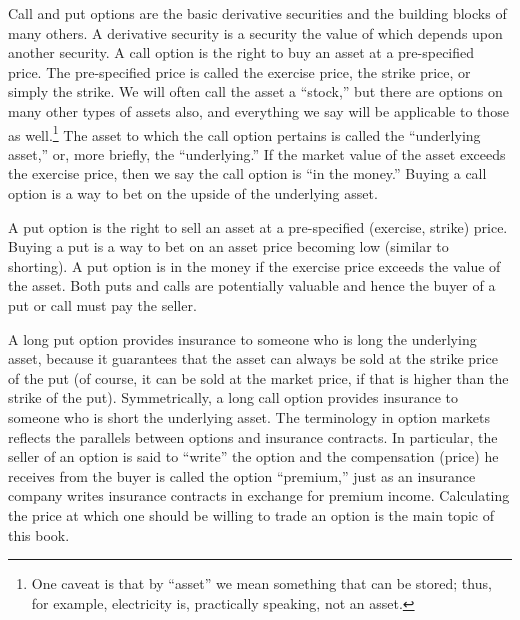 Call and put options are the basic derivative securities and the building blocks of many others.  A derivative security is a security the value of which depends upon another security. 
A call option  is the right to buy an asset at a pre-specified price.  The pre-specified price is called the exercise price, the strike price, or simply the strike.    We will often call the asset a ``stock,'' but there are options on many other types of assets also, and everything we say will be applicable to those as well.\footnote{One caveat is that by ``asset'' we mean something that can be stored; thus, for example, electricity is, practically speaking, not an asset.}  The asset to which the call option pertains is called the ``underlying asset,''  or, more briefly, the ``underlying.''  If the market value of the asset exceeds the exercise price, then we say the call option is ``in the money.''  Buying a call option is a way to bet on the upside of the underlying asset.  

A put option  is the right to sell an asset at a pre-specified (exercise, strike) price.  Buying a put is a way to bet on an asset price becoming low (similar to shorting).  A put option is in the money if the exercise price exceeds the value of the asset.  Both puts and calls are potentially valuable and hence the buyer of a put or call must pay the seller.  

A long put option provides insurance to someone who is long the underlying asset, because it guarantees that the asset can always be sold at the strike price of the put (of course, it can be sold at the market price, if that is higher than the strike of the put).  Symmetrically, a long call option provides insurance to someone who is short the underlying asset. The terminology in option markets reflects the parallels between options and insurance contracts.  In particular, the seller of an option is said to ``write'' the option and the compensation (price) he receives from the buyer is called the option ``premium,''  just as an insurance company writes insurance contracts in exchange for premium income.  Calculating the price at which one should be willing to trade an option is the main topic of this book.

